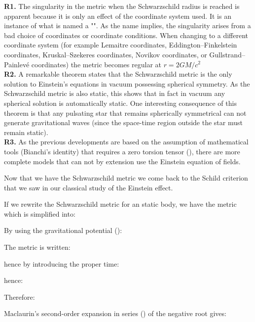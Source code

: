 	\begin{tcolorbox}[title=Remarks,colframe=black,arc=10pt]
	\textbf{R1.} The singularity in the metric when the Schwarzschild radius is reached is apparent because it is only an effect of the coordinate system used. It is an instance of what is named a "". As the name implies, the singularity arises from a bad choice of coordinates or coordinate conditions. When changing to a different coordinate system (for example Lemaitre coordinates, Eddington–Finkelstein coordinates, Kruskal–Szekeres coordinates, Novikov coordinates, or Gullstrand–Painlevé coordinates) the metric becomes regular at $r=2GM/c^2$\\
	
	\textbf{R2.} A remarkable theorem states that the Schwarzschild metric is the only solution to Einstein's equations in vacuum possessing spherical symmetry. As the Schwarzschild metric is also static, this shows that in fact in vacuum any spherical solution is automatically static. One interesting consequence of this theorem is that any pulsating star that remains spherically symmetrical can not generate gravitational waves (since the space-time region outside the star must remain static).\\
	
	\textbf{R3.} As the previous developments are based on the assumption of mathematical tools (Bianchi's identity) that requires a zero torsion tensor (), there are more complete models that can not by extension use the Einstein equation of fields.
	\end{tcolorbox}	
	Now that we have the Schwarzschild metric we come back to the Schild criterion that we saw in our classical study of the Einstein effect.

	If we rewrite the Schwarzschild metric for an static body, we have the metric which is simplified into:
	
	By using the gravitational potential ():
	
	The metric is written:
	
	hence by introducing the proper time:
	
	hence:
	
	Therefore:
	
	Maclaurin's second-order expansion in series () of the negative root gives:
	
